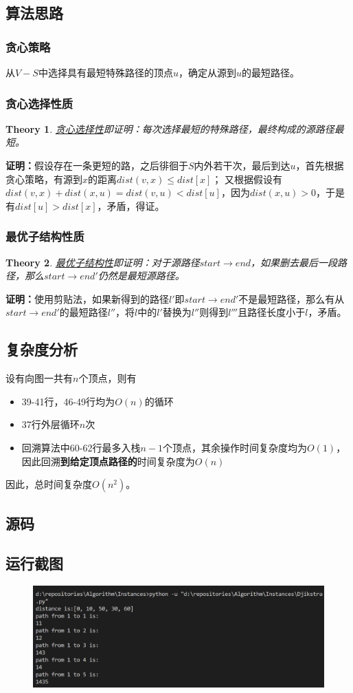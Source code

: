 \documentclass{ctexart}[UTF8]
\newtheorem{theorem}{Theory}[section]
\begin{document}
    \subsection{算法思路}
    \subsubsection{贪心策略}
    从$V-S$中选择具有最短特殊路径的顶点$u$，确定从源到$u$的最短路径。
    \subsubsection{贪心选择性质}
    \begin{theorem}
        \underline{贪心选择性}即证明：每次选择最短的特殊路径，最终构成的源路径最短。
    \end{theorem}
    \textbf{证明：}假设存在一条更短的路，之后徘徊于$S$内外若干次，最后到达$u$，首先根据贪心策略，有源到$x$的距离$dist(v,x) \le dist[x]$；
    又根据假设有$dist(v,x) + dist(x,u) = dist(v,u) < dist[u]$，因为$dist(x,u) > 0$，于是有$dist[u] > dist[x]$，矛盾，得证。
    \subsubsection{最优子结构性质}
    \begin{theorem}
        \underline{最优子结构性}即证明：对于源路径$start\rightarrow end$，如果删去最后一段路径，那么$start\rightarrow end'$仍然是最短源路径。 
    \end{theorem}
    \textbf{证明：}使用剪贴法，如果新得到的路径$l'$即$start\rightarrow end'$不是最短路径，那么有从$start\rightarrow end'$的最短路径$l''$，将$l$中的$l'$替换为$l''$则得到$l'''$且路径长度小于$l$，矛盾。
    \subsection{复杂度分析}
    设有向图一共有$n$个顶点，则有 \begin{itemize}
        \item 39-41行，46-49行均为$O(n)$的循环
        \item 37行外层循环$n$次
        \item 回溯算法中60-62行最多入栈$n-1$个顶点，其余操作时间复杂度均为$O(1)$，因此回溯\textbf{到给定顶点路径的}时间复杂度为$O(n)$
    \end{itemize}
    \par 因此，总时间复杂度$O(n^2)$。
    \subsection{源码}
    
    \subsection{运行截图}
    \begin{figure}[H]
        \centering
        \includegraphics[width=14cm]{../Resources/10_2.png}
    \end{figure}
\end{document}
